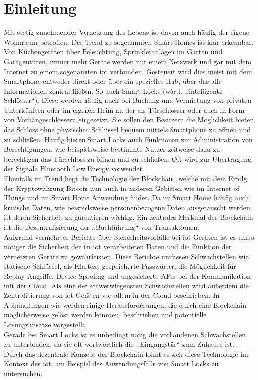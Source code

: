 \section{Einleitung}
\label{sec:intro}
    Mit stetig zunehmender Vernetzung des Lebens ist davon auch häufig der eigene Wohnraum betroffen. 
    Der Trend zu sogenannten Smart Homes ist klar erkennbar\cite{Paley2018}. 
    Von Küchengeräten über Beleuchtung, Sprinkleranlagen im Garten und Ga\-ra\-gen\-tü\-ren, immer mehr Geräte werden mit einem Netzwerk und gar mit dem Internet zu einem sogenannten \gls{iot} verbunden. 
    Gesteuert wird dies meist mit dem Smartphone entweder direkt oder über ein spezielles Hub, über das alle Informationen zentral fließen.
    So auch Smart Locks (wörtl. ,,intelligente Schlösser``).
    Diese werden häufig auch bei Buchung und Vermietung von privaten Unterkünften oder im eigenen Heim an der als Türschlosser oder auch in Form von Vorhängeschlössern eingesetzt.
    Sie sollen den Besitzern die Möglichkeit bieten das Schloss ohne physischen Schlüssel bequem mittels Smartphone zu öffnen und zu schließen\cite{Ho2016}.
    Häufig bieten Smart Locks auch Funktionen zur Administration von Berechtigungen, wie beispielsweise bestimmte Nutzer zeitweise dazu zu berechtigen das Türschloss zu öffnen und zu schließen\cite{Ye2017}.
    Oft wird zur Übertragung der Signale Bluetooth Low Energy verwendet\cite{Fuller2017}.
    \medskip\\
    Ebenfalls im Trend liegt die Technologie der Blockchain, welche mit dem Erfolg der Kryptowährung Bitcoin nun auch in anderen Gebieten wie im Internet of Things und im Smart Home Anwendung findet\cite{Conoscenti2016,Kshetri2017}.
    Da im Smart Home häufig auch kritische Daten, wie beispielsweise personenbezogene Daten ausgetauscht werden, ist deren Sicherheit zu garantieren wichtig.
    Ein zentrales Merkmal der Blockchain ist die Dezentralisierung der ,,Buchführung`` von Transaktionen.
    \medskip\\
    Aufgrund vermehrter Berichte über Sicherheitsvorfälle bei \gls{iot}-Geräten ist es umso nötiger die Sicherheit der im \gls{iot} verarbeiteten Daten und die Funktion der vernetzten Geräte zu gewährleisten.
    Diese Berichte umfassen Schwachstellen wie statische Schlüssel, als Klartext gespeicherte Passwörter, die Möglichkeit für Replay-Angriffe, Device-Spoofing\cite{Rose2016} und ungesicherte APIs bei der Kommunikation mit der Cloud\cite{Stykas2018}. 
    Als eine der schwerwiegensten Schwachstellen wird außerdem die Zentralisierung von \gls{iot}-Geräten vor allem in der Cloud beschrieben\cite{Kshetri2017}.
    In Abhandlungen wie \cite{Kshetri2017} werden einige Herausforderungen, die durch eine Blockchain möglicherweise gelöst werden könnten, beschrieben und potentielle Lösungsansätze vorgestellt.
    \medskip\\
    Gerade bei Smart Locks ist es unbedingt nötig die vorhandenen Schwachstellen zu unterbinden, da sie oft wortwörtlich die ,,Eingangstür`` zum Zuhause ist.
    Durch das dezentrale Konzept der Blockchain\cite{Nakamoto2008} lohnt es sich diese Technologie im Kontext des \gls{iot}, am Beispiel des Anwendungsfalls von Smart Locks zu untersuchen.
    
